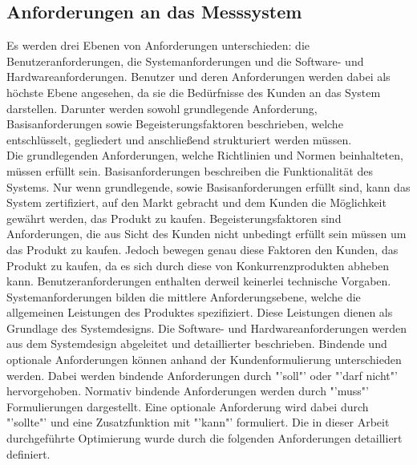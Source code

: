 \subsection{Anforderungen an das Messsystem}\label{sec:anforderungen}
Es werden drei Ebenen von Anforderungen unterschieden: die Benutzeranforderungen, die Systemanforderungen und die Software- und Hardwareanforderungen.\newline
Benutzer und deren Anforderungen werden dabei als höchste Ebene angesehen, da sie die Bedürfnisse des Kunden an das System darstellen. Darunter werden sowohl grundlegende Anforderung, Basisanforderungen sowie Begeisterungsfaktoren beschrieben, welche entschlüsselt, gegliedert und anschließend strukturiert werden müssen.\\
Die grundlegenden Anforderungen, welche Richtlinien und Normen beinhalteten, müssen erfüllt sein. Basisanforderungen beschreiben die Funktionalität des Systems. Nur wenn grundlegende, sowie Basisanforderungen erfüllt sind, kann das System zertifiziert, auf den Markt gebracht und dem Kunden die Möglichkeit gewährt werden, das Produkt zu kaufen. Begeisterungsfaktoren sind Anforderungen, die aus Sicht des Kunden nicht unbedingt erfüllt sein müssen um das Produkt zu kaufen. Jedoch bewegen genau diese Faktoren den Kunden, das Produkt zu kaufen, da es sich durch diese von Konkurrenzprodukten abheben kann. Benutzeranforderungen enthalten derweil keinerlei technische Vorgaben.\newline
Systemanforderungen bilden die mittlere Anforderungsebene, welche die allgemeinen Leistungen des Produktes spezifiziert. Diese Leistungen dienen als Grundlage des Systemdesigns.\newline
Die Software- und Hardwareanforderungen werden aus dem Systemdesign abgeleitet und detaillierter beschrieben.\newline %
Bindende und optionale Anforderungen können anhand der Kundenformulierung unterschieden werden. Dabei werden bindende Anforderungen durch "'soll"' oder "'darf nicht"' hervorgehoben. Normativ bindende Anforderungen werden durch "'muss"' Formulierungen dargestellt. Eine optionale Anforderung wird dabei durch "'sollte"' und eine Zusatzfunktion mit "'kann"' formuliert.\newline
Die in dieser Arbeit durchgeführte Optimierung wurde durch die folgenden Anforderungen detailliert definiert.
